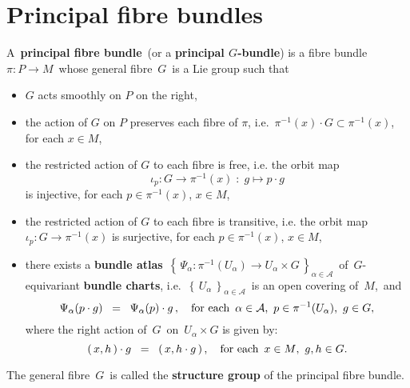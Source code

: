 

\section{Principal fibre bundles}
\setcounter{theorem}{0}
\setcounter{equation}{0}


\renewcommand{\theenumi}{\roman{enumi}}
\renewcommand{\labelenumi}{\textnormal{(\theenumi)}$\;\;$}


\begin{definition}
\mbox{}
\vskip 0.2cm
\noindent
A \,\textbf{principal fibre bundle}\, (or a \textbf{principal $G$-bundle})
is a fibre bundle \,$\pi : P \longrightarrow M$\,
whose general fibre \,$G$\, is a Lie group such that
\begin{itemize}
\item
	$G$ acts smoothly on $P$ {\color{red}on the right},
\item
	the action of $G$ on $P$ preserves each fibre of $\pi$, i.e. \,$\pi^{-1}(x) \cdot G \subset \pi^{-1}(x)$,\,
	for each $x \in M$,
\item
	the restricted action of $G$ to each fibre is free, i.e.
	the orbit map
	\begin{equation*}
	\iota_{p} : G \longrightarrow \pi^{-1}(x) \; : \; g \longmapsto p \cdot g
	\end{equation*}
	is injective,
	for each $p \in \pi^{-1}(x)$, $x \in M$,
\item
	the restricted action of $G$ to each fibre is transitive, i.e.
	the orbit map $\iota_{p} : G \longrightarrow \pi^{-1}(x)$ is surjective,
	for each $p \in \pi^{-1}(x)$, $x \in M$,
\item
	there exists a \textbf{bundle atlas}
	\,$\left\{\,\Psi_{\alpha} : \pi^{-1}(U_{\alpha}) \longrightarrow U_{\alpha} \times G\,\right\}_{\alpha\in\mathcal{A}}$\,
	of \,{\color{red}$G$-equivariant \textbf{bundle charts}}, i.e.
	\,$\left\{\,U_{\alpha}\,\right\}_{\alpha\in\mathcal{A}}$\,
	is an open covering of \,$M$,\, and
	\begin{equation*}
	\Psi_{\alpha}(p \cdot g) \;\; = \;\; \Psi_{\alpha}(p) \cdot g\,,
	\quad
	\textnormal{for each \,$\alpha \in \mathcal{A}$, \,$p \in \pi^{-1}(U_{\alpha})$, \,$g \in G$},
	\end{equation*}
	where the right action of \,$G$\, on \,$U_{\alpha} \times G$ is given by:
	\begin{equation*}
	(\,x,h\,) \cdot g \;\; = \;\; (\,x,h \cdot g\,)\,,
	\quad
	\textnormal{for each \,$x \in M$, \,$g,h \in G$}.
	\end{equation*}
\end{itemize}
The general fibre \,$G$\, is called the \textbf{structure group} of the principal fibre bundle.
\end{definition}

